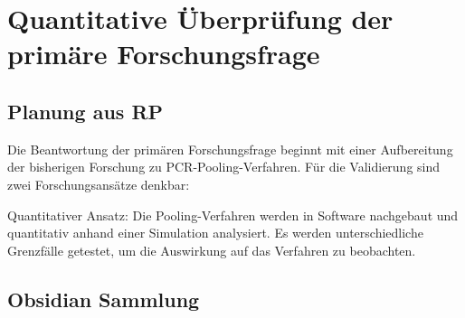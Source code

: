 \chapter{Quantitative Überprüfung der primäre Forschungsfrage}

\cleardoublepage
\cleardoublepage

\section{Planung aus RP}
Die Beantwortung der primären Forschungsfrage beginnt mit einer Aufbereitung der bisherigen Forschung zu PCR-Pooling-Verfahren.
Für die Validierung sind zwei Forschungsansätze denkbar:

 Quantitativer Ansatz:
	Die Pooling-Verfahren werden in Software nachgebaut und quantitativ anhand einer Simulation analysiert.
	Es werden unterschiedliche Grenzfälle getestet, um die Auswirkung auf das Verfahren zu beobachten.


\section{Obsidian Sammlung}
\fi